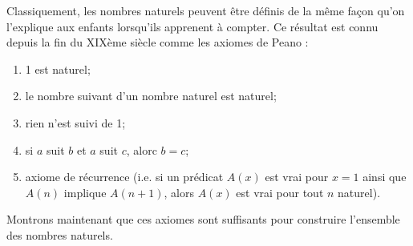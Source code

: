 \documentclass[12pt, a4paper]{article}
\begin{document}
Classiquement, les nombres naturels peuvent être définis de la même façon qu'on l'explique aux enfants lorsqu'ils apprenent à compter. Ce résultat est connu depuis la fin du XIXème siècle comme les axiomes de Peano :
\begin{enumerate}
	\item 1 est naturel;
	\item le nombre suivant d'un nombre naturel est naturel;
	\item rien n'est suivi de 1;
	\item si $a$ suit $b$ et $a$ suit $c$, alorc $b=c$;
	\item axiome de récurrence (i.e. si un prédicat $A(x)$ est vrai pour $x=1$ ainsi que $A(n)$ implique $A(n+1)$, alors $A(x)$ est vrai pour tout $n$ naturel).
\end{enumerate}
Montrons maintenant que ces axiomes sont suffisants pour construire l'ensemble des nombres naturels.
\end{document}
